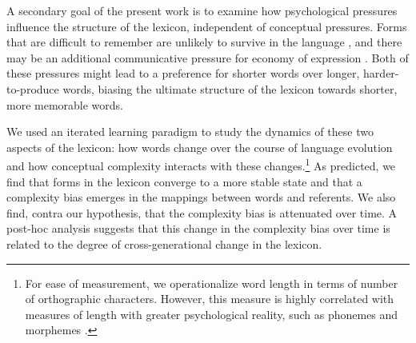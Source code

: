 A secondary goal of the present work is to examine how psychological pressures influence the structure of the lexicon, independent of conceptual pressures.  Forms that are difficult to remember are unlikely to survive in the language  \cite{christiansen2008}, and there may be an additional communicative pressure for economy of expression \cite{zipf1949human}. Both of these pressures might lead to a preference for shorter words over longer, harder-to-produce words, biasing the ultimate structure of the lexicon towards shorter, more memorable words. 



We used an iterated learning paradigm to study the dynamics of these two aspects of the lexicon: how  words change over the course of language evolution and how conceptual complexity interacts with these changes.\footnote{For ease of measurement, we operationalize word length in terms of number of orthographic characters. However, this measure is highly correlated with measures of length with greater psychological reality, such as phonemes and morphemes \cite{lewisstructure2014}.} As predicted, we find that forms in the lexicon converge to a more stable state and that a complexity bias emerges in the mappings between words and referents. We also find, contra our hypothesis, that the complexity bias is attenuated over time. A post-hoc analysis suggests that this change in the complexity bias over time is related to the degree of cross-generational change in the lexicon.


